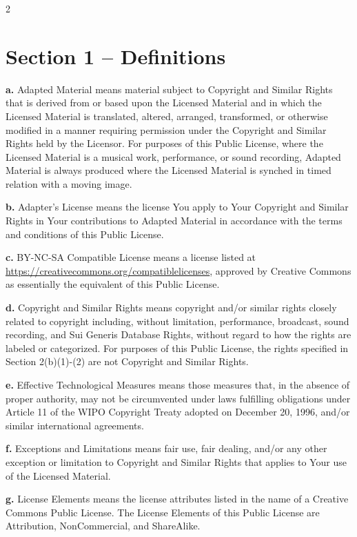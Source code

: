 \begin{multicols*}{2}
    \section*{Section 1 -- Definitions}

    \textbf{a.} Adapted Material means material subject to Copyright and Similar
    Rights that is derived from or based upon the Licensed Material and in
    which the Licensed Material is translated, altered, arranged,
    transformed, or otherwise modified in a manner requiring permission
    under the Copyright and Similar Rights held by the Licensor. For
    purposes of this Public License, where the Licensed Material is a
    musical work, performance, or sound recording, Adapted Material is
    always produced where the Licensed Material is synched in timed
    relation with a moving image.

    \textbf{b.} Adapter's License means the license You apply to Your Copyright
    and Similar Rights in Your contributions to Adapted Material in
    accordance with the terms and conditions of this Public License.

    \textbf{c.} BY-NC-SA Compatible License means a license listed at
    \url{https://creativecommons.org/compatiblelicenses}, approved by Creative
    Commons as essentially the equivalent of this Public License.

    \textbf{d.} Copyright and Similar Rights means copyright and/or similar rights
    closely related to copyright including, without limitation,
    performance, broadcast, sound recording, and Sui Generis Database
    Rights, without regard to how the rights are labeled or categorized.
    For purposes of this Public License, the rights specified in Section
    2(b)(1)-(2) are not Copyright and Similar Rights.

    \textbf{e.} Effective Technological Measures means those measures that, in the
    absence of proper authority, may not be circumvented under laws
    fulfilling obligations under Article 11 of the WIPO Copyright Treaty
    adopted on December 20, 1996, and/or similar international agreements.

    \textbf{f.} Exceptions and Limitations means fair use, fair dealing, and/or
    any other exception or limitation to Copyright and Similar Rights that
    applies to Your use of the Licensed Material.

    \textbf{g.} License Elements means the license attributes listed in the name
    of a Creative Commons Public License. The License Elements of this
    Public License are Attribution, NonCommercial, and ShareAlike.


\end{multicols*}
